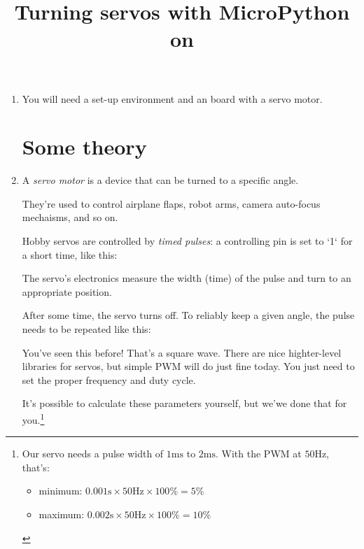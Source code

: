 \documentclass{../tutorial}
\title{Turning servos with MicroPython on \abbr{ESP32}}
\begin{document}
\begin{enumerate}

\item
    You will need a set-up environment and an  board
    with a servo motor.

\section{Some theory}

\item
    A \emph{servo motor} is a device that can be turned to a specific angle.

    They're used to control airplane flaps, robot arms,
    camera auto-focus mechaisms, and so on.

    Hobby servos are controlled by \emph{timed pulses}: a controlling pin is
    set to `1` for a short time, like this:

    \begin{figure}[h]
        \centering
    \end{figure}

    \begin{figure}[h]
        \centering
    \end{figure}

    The servo's electronics measure the width (time) of the pulse and
    turn to an appropriate position.

    After some time, the servo turns off.
    To reliably keep a given angle,
    the pulse needs to be repeated like this:

    \begin{figure}[h]
        \centering
    \end{figure}

    You've seen this before! That's a square wave.
    There are nice highter-level libraries for servos,
    but simple PWM will do just fine today.
    You just need to set the proper frequency and duty cycle.

    It's possible to calculate these parameters yourself, but we'we done that
    for you.\footnote{
        Our servo needs a pulse width of
        $1 \si{\milli\second}$ to $2 \si{\milli\second}$.
        With the PWM at $50 \si{\hertz}$, that's:

        \begin{itemize}
        \item minimum:
            ${0.001 \si{\second}} \times {50 \si{\hertz}} \times 100\% = 5\%$
        \item maximum:
            ${0.002 \si{\second}} \times {50 \si{\hertz}} \times 100\% = 10\%$
        \end{itemize}

}
\end{enumerate}
\end{document}
